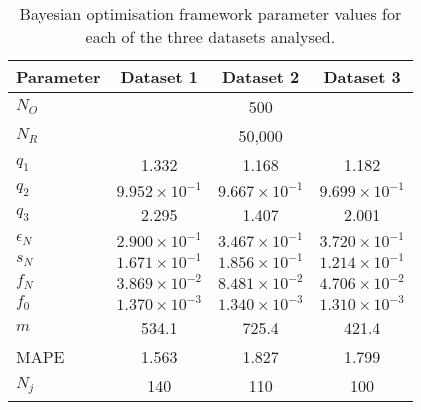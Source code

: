 \begin{table}[!htbp]
\centering
\caption{Bayesian optimisation framework parameter values for each of the three datasets analysed. }
\label{tab:bo_parameter_values}
\begin{tabular}{lccc}
\toprule
\textbf{Parameter} & \textbf{Dataset 1} & \textbf{Dataset 2} & \textbf{Dataset 3} \\
\midrule
$N_O$ & \multicolumn{3}{c}{500}\\
$N_R$ & \multicolumn{3}{c}{50,000}\\
\midrule
\textbf{$q_1$} &    1.332 &    1.168 &    1.182 \\
\textbf{$q_2$} &    $9.952\times10^{-1}$ &    $9.667\times10^{-1}$ &    $9.699\times10^{-1}$\\
\textbf{$q_3$} &    2.295 &    1.407 &    2.001 \\
\textbf{$\epsilon_N$} &    $2.900\times10^{-1}$ &    $3.467\times10^{-1}$ &    $3.720\times10^{-1}$\\
\textbf{$s_N$} &    $1.671\times10^{-1}$ &    $1.856\times10^{-1}$ &    $1.214\times10^{-1}$\\
\textbf{$f_N$} &    $3.869\times10^{-2}$ &    $8.481\times10^{-2}$ &    $4.706\times10^{-2}$\\
\textbf{$f_0$} &    $1.370\times10^{-3}$ &   $1.340 \times 10^{-3}$ &    $1.310 \times 10^{-3}$ \\
\textbf{$m$} &  534.1 &  725.4 &  421.4 \\
{MAPE} &    1.563 &    1.827 &    1.799 \\
{$N_j$} &  140 &  110 &  100 \\
\bottomrule
\end{tabular}
\end{table}
